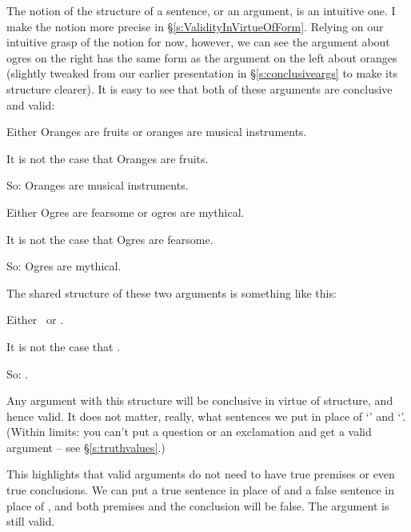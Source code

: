 The notion of the structure of a sentence, or an argument, is an intuitive one. I make the notion more precise in §\ref{s:ValidityInVirtueOfForm}. Relying on our intuitive grasp of the notion for now, however, we can see the  argument about ogres on the right has the same form as the argument on the left about oranges (slightly tweaked from our earlier presentation in §\ref{s:conclusiveargs} to make its structure clearer). It is easy to see that both of these arguments are conclusive and valid:

 \begin{minipage}{\textwidth}
	\begin{minipage}{0.47\textwidth}
		\begin{earg}
	\item[] \textsf{Either} Oranges are fruits \textsf{or} oranges are musical instruments.
	\item[] \textsf{It is not the case that} Oranges are fruits.
	\item[So:] Oranges are musical instruments.
\end{earg} 
	\end{minipage}\qquad
	\begin{minipage}{0.47\textwidth}
		\begin{earg}
	\item[] \textsf{Either} Ogres are fearsome \textsf{or} ogres are mythical.
	\item[] \textsf{It is not the case that} Ogres are fearsome.
	\item[So:] Ogres are mythical.
\end{earg}
	\end{minipage}
	\end{minipage}

The shared structure of these two arguments is something like this:
\begin{earg}
	\item[] \textsf{Either} \ \textsf{or} .
	\item[] \textsf{It is not the case that} .
	\item[So:] .
\end{earg}
Any argument with this structure will be conclusive in virtue of structure, and hence valid. It does not matter, really, what sentences we put in place of ‘’ and `'. (Within limits: you can't put a question or an exclamation and get a valid argument – see §\ref{s:truthvalues}.) 

This highlights that valid arguments do not need to have true premises or even true conclusions. We can put a true sentence in place of  and a false sentence in place of , and both premises and the conclusion will be false. The argument is still valid.

